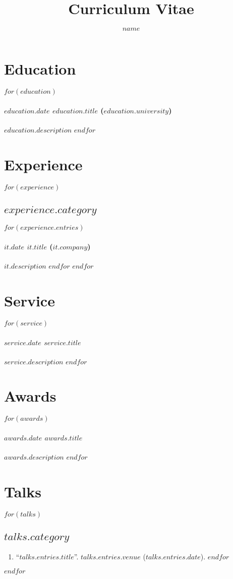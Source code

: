 \documentclass[11pt]{article}
\title{Curriculum Vitae}
\author{$name$}
\begin{document}
\maketitle

\section*{Education}
$for(education)$
\paragraph{$education.date$ $education.title$ ($education.university$)}
$education.description$
$endfor$

\section*{Experience}
$for(experience)$
\subsection*{$experience.category$}
$for(experience.entries)$
\paragraph{$it.date$ $it.title$ ($it.company$)}
$it.description$
$endfor$
$endfor$

\section*{Service}
$for(service)$
\paragraph{$service.date$ $service.title$}
$service.description$
$endfor$

\section*{Awards}
$for(awards)$
\paragraph{$awards.date$ $awards.title$}
$awards.description$
$endfor$

\section*{Talks}
$for(talks)$
\subsection*{$talks.category$}
\begin{enumerate}
$for(talks.entries)$
\item ``\href{$talks.entires.link$}{$talks.entries.title$}''. $talks.entries.venue$ ($talks.entries.date$).
$endfor$
\end{enumerate}
$endfor$
\end{document}
